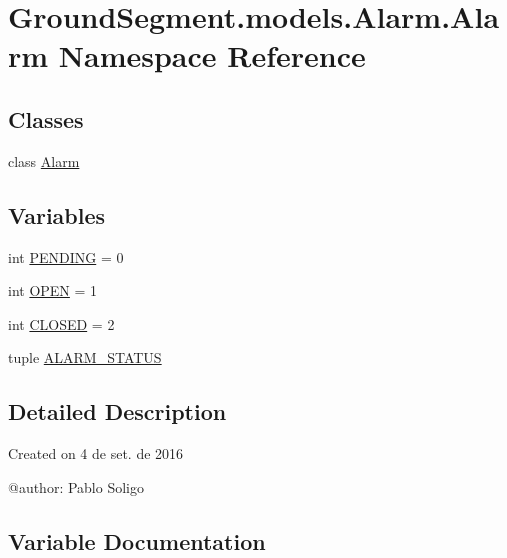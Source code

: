 \hypertarget{namespace_ground_segment_1_1models_1_1_alarm_1_1_alarm}{}\section{Ground\+Segment.\+models.\+Alarm.\+Alarm Namespace Reference}
\label{namespace_ground_segment_1_1models_1_1_alarm_1_1_alarm}
\subsection*{Classes}
\begin{DoxyCompactItemize}
\item 
class \hyperlink{class_ground_segment_1_1models_1_1_alarm_1_1_alarm_1_1_alarm}{Alarm}
\end{DoxyCompactItemize}
\subsection*{Variables}
\begin{DoxyCompactItemize}
\item 
int \hyperlink{namespace_ground_segment_1_1models_1_1_alarm_1_1_alarm_a7da10688411c57e77ab61a75be47fa1d}{P\+E\+N\+D\+I\+N\+G} = 0
\item 
int \hyperlink{namespace_ground_segment_1_1models_1_1_alarm_1_1_alarm_a0627d177d994c21e4a00b2f618c65c99}{O\+P\+E\+N} = 1
\item 
int \hyperlink{namespace_ground_segment_1_1models_1_1_alarm_1_1_alarm_af486c75414a4a8ebd2033a4df946ae67}{C\+L\+O\+S\+E\+D} = 2
\item 
tuple \hyperlink{namespace_ground_segment_1_1models_1_1_alarm_1_1_alarm_afbe0bd9a88ba48a14a30f9a148b8f9c4}{A\+L\+A\+R\+M\+\_\+\+S\+T\+A\+T\+U\+S}
\end{DoxyCompactItemize}


\subsection{Detailed Description}
\begin{DoxyVerb}Created on 4 de set. de 2016

@author: Pablo Soligo
\end{DoxyVerb}
 

\subsection{Variable Documentation}
\hypertarget{namespace_ground_segment_1_1models_1_1_alarm_1_1_alarm_afbe0bd9a88ba48a14a30f9a148b8f9c4}{}
